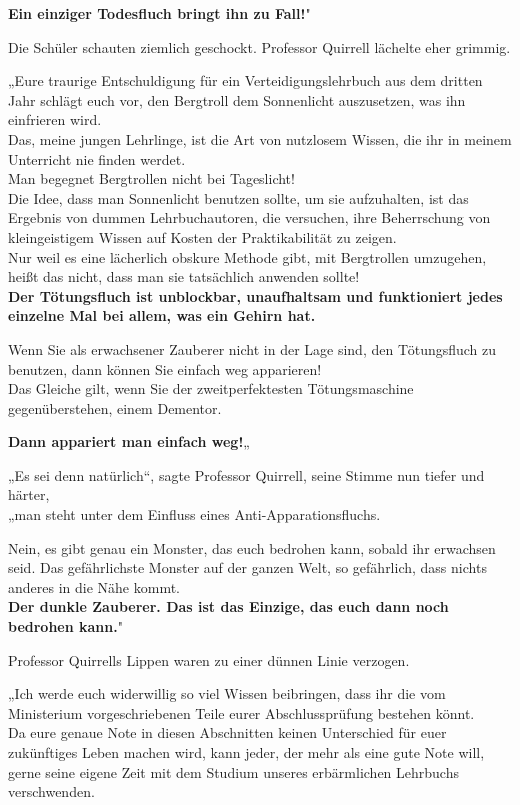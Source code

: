 {\hfill\break \textbf{Ein einziger Todesfluch bringt ihn zu Fall!}"

Die Schüler schauten ziemlich geschockt. Professor Quirrell lächelte eher grimmig.

„Eure traurige Entschuldigung für ein Verteidigungslehrbuch aus dem dritten Jahr schlägt euch vor, den Bergtroll dem Sonnenlicht auszusetzen, was ihn einfrieren wird.\\ Das, meine jungen Lehrlinge, ist die Art von nutzlosem Wissen, die ihr in meinem Unterricht nie finden werdet.\\ Man begegnet Bergtrollen nicht bei Tageslicht!\\ Die Idee, dass man Sonnenlicht benutzen sollte, um sie aufzuhalten, ist das Ergebnis von dummen Lehrbuchautoren, die versuchen, ihre Beherrschung von kleingeistigem Wissen auf Kosten der Praktikabilität zu zeigen.\\ Nur weil es eine lächerlich obskure Methode gibt, mit Bergtrollen umzugehen, heißt das nicht, dass man sie tatsächlich anwenden sollte!\\

\hfill\break \textbf{Der Tötungsfluch ist unblockbar, unaufhaltsam und funktioniert jedes einzelne Mal bei allem, was ein Gehirn hat.}

Wenn Sie als erwachsener Zauberer nicht in der Lage sind, den Tötungsfluch zu benutzen, dann können Sie einfach weg apparieren!\\ Das Gleiche gilt, wenn Sie der zweitperfektesten Tötungsmaschine gegenüberstehen, einem Dementor.

\textbf{Dann appariert man einfach weg!}„

„Es sei denn natürlich“, sagte Professor Quirrell, seine Stimme nun tiefer und härter,\\ „man steht unter dem Einfluss eines Anti-Apparationsfluchs.

Nein, es gibt genau ein Monster, das euch bedrohen kann, sobald ihr erwachsen seid. Das gefährlichste Monster auf der ganzen Welt, so gefährlich, dass nichts anderes in die Nähe kommt.\\ \textbf{\hfill\break Der dunkle Zauberer. Das ist das Einzige, das euch dann noch bedrohen kann.}"

Professor Quirrells Lippen waren zu einer dünnen Linie verzogen.

„Ich werde euch widerwillig so viel Wissen beibringen, dass ihr die vom Ministerium vorgeschriebenen Teile eurer Abschlussprüfung bestehen könnt.\\ Da eure genaue Note in diesen Abschnitten keinen Unterschied für euer zukünftiges Leben machen wird, kann jeder, der mehr als eine gute Note will, gerne seine eigene Zeit mit dem Studium unseres erbärmlichen Lehrbuchs verschwenden.

}
